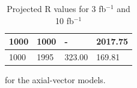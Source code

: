 \begin{table}[h]
\begin{tabular}{llll}
1000 &   1000    &-         & 2017.75 \\ \hline
1000  &    1995  &    323.00  &  169.81 \\\hline
\end{tabular}
\caption{Projected R values for 3 fb$^{-1}$ and 10 fb$^{-1}$} for the axial-vector models.
\label{tab:dm_A_R_values}
\end{table}


